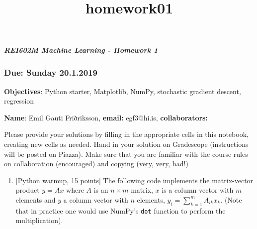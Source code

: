 \documentclass[11pt]{article}
\title{homework01}
\providecommand{\tightlist}{%
      \setlength{\itemsep}{0pt}\setlength{\parskip}{0pt}}
\begin{document}
    
    
    \maketitle
    
    

    
    \subparagraph{REI602M Machine Learning - Homework
1}\label{rei602m-machine-learning---homework-1}

\subsubsection{Due: Sunday 20.1.2019}\label{due-sunday-20.1.2019}

\textbf{Objectives}: Python starter, Matplotlib, NumPy, stochastic
gradient descent, regression

\textbf{Name}: Emil Gauti Friðriksson, \textbf{email: } egf3@hi.is,
\textbf{collaborators:}

Please provide your solutions by filling in the appropriate cells in
this notebook, creating new cells as needed. Hand in your solution on
Gradescope (instructions will be posted on Piazza). Make sure that you
are familiar with the course rules on collaboration (encouraged) and
copying (very, very, bad!)

    \begin{enumerate}
\def\labelenumi{\arabic{enumi})}
\tightlist
\item
  {[}Python warmup, 15 points{]} The following code implements the
  matrix-vector product \(y=Ax\) where \(A\) is an \(n \times m\)
  matrix, \(x\) is a column vector with \(m\) elements and \(y\) a
  column vector with \(n\) elements, \(y_i = \sum_{k=1}^m A_{ik}x_k\).
  (Note that in practice one would use NumPy's \texttt{dot} function to
  perform the multiplication).
\end{enumerate}
\end{document}
